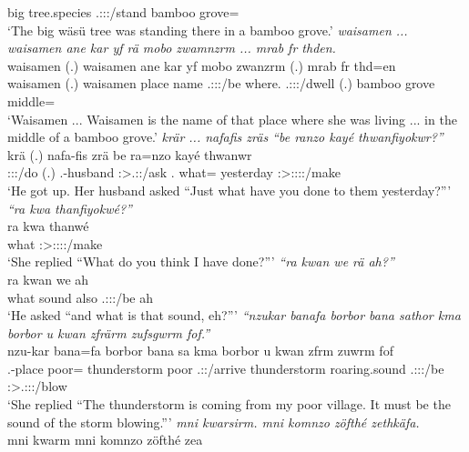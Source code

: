 \begin{exe}
	big {tree.species} \Tsg.\Masc:\Sbj:\Pst:\Dur/stand bamboo grove=\Loc\\
	\trans `The big wäsü tree was standing there in a bamboo grove.'
	\emph{waisamen ... waisamen ane kar yf rä mobo zwamnzrm ... mrab fr thden.}\\
	\gll waisamen (.) waisamen ane kar yf  mobo zwanzrm (.) mrab fr thd=en\\
	waisamen (.) waisamen {\Dem} place name \Tsg.\F:\Sbj:\Nonpast:\Ipfv/be where.{\All} \Tsg.\F:\Sbj:\Pst:\Dur/dwell (.) bamboo grove middle={\Loc}\\
	\trans `Waisamen ... Waisamen is the name of that place where she was living ... in the middle of a bamboo grove.'
	\emph{krär ... nafafis zräs ``be ranzo kayé thwanfiyokwr?''}\\
	\gll krä (.) nafa-fis zrä be ra=nzo kayé thwanwr\\
	\Stsg:\Sbj:\Irr:\Pfv/do (.) \Third.\Poss-husband \Stsg:\Sbj>\Tsg.\F:\Irr:\Pfv/ask \Ssg.{\Erg} what={\Only} yesterday \Stsg:\Sbj>\Stpl:\Obj:\Rpst:\Ipfv:\Venit/make\\
	\trans `He got up. Her husband asked ``Just what have you done to them yesterday?'''
	\emph{``ra kwa thanfiyokwé?'' }\\
	\gll ra kwa thanwé\\
	what {\Fut} \Fsg:\Sbj>\Stpl:\Obj:\Rpst:\Ipfv:\Venit/make\\
	\trans `She replied ``What do you think I have done?'''
	\emph{``ra kwan we rä ah?''}\\
	\gll ra kwan we  ah\\
	what sound also \Tsg.\F:\Sbj:\Nonpast:\Ipfv/be ah\\
	\trans `He asked ``and what is that sound, eh?'''
	\emph{``nzukar banafa borbor bana sathor kma borbor u kwan zfrärm zufsgwrm fof.''}\\
	\gll nzu-kar bana=fa borbor bana sa kma borbor {u kwan} zfrm zuwrm fof\\
	\Fsg.\Poss-place poor={\Abl} thunderstorm poor \Tsg.\Masc:\Rpst:\Pfv/arrive {\Pot} thunderstorm {roaring.sound} \Tsg.\F:\Sbj:\Pst:\Dur/be \Sg:\Sbj>\Tsg.\F:\Obj:\Pst:\Dur/blow \Emph\\
	\trans `She replied ``The thunderstorm is coming from my poor village. It must be the sound of the storm blowing.'''
	\emph{mni kwarsirm. mni komnzo zöfthé zethkäfa.}\\
	\gll mni kwarm mni komnzo zöfthé zea\\

\end{exe}
